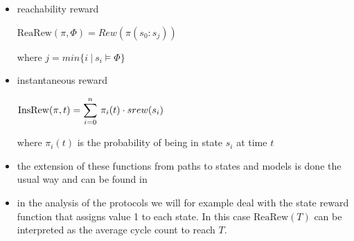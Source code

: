 \documentclass[a4paper, 10pt]{article}
\begin{document}
\begin{itemize}
	\item reachability reward
		\begin{center}
			$\mathrm{ReaRew}(\pi, \Phi) = \mathit{Rew}(\pi(s_0:s_j))$
		\end{center}
		where $j = min \{ i~|~s_i \models \Phi \}$
	\item instantaneous reward
		\begin{center}
			$\mathrm{InsRew}(\pi , t) = \mathlarger{ \sum }\limits_{i=0}^{n}~\pi_i(t) \cdot srew(s_i)$
		\end{center}
		where $\pi_i(t)$ is the probability of being in state $s_i$ at time $t$
	\item the extension of these functions from paths to states and models is done the usual way and can be found in \cite{bhhk03}
	\item in the analysis of the protocols we will for example deal with the state reward function that assigns value 1 to each state. In this case $\mathrm{ReaRew}(T)$ can be interpreted as the average cycle count to reach $T$.
\end{itemize}

\end{document}
